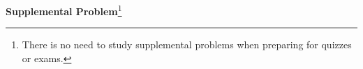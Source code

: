 \documentclass[handout]{mcs}
\begin{document}




\begin{center}
\textbf{Supplemental Problem}\footnote{There is no need to study supplemental
  problems when preparing for quizzes or exams.}
\end{center}


\iffalse
\pinput{PS_predicate_calculus_power_of_two}
\pinput{PS_6042_staff_cabal}
\pinput{FP_logic_of_leq}
\pinput{CP_logic_news_network}  %
\pinput{PS_emailed_exactly_2_others}  %
\pinput{PS_express_in_predicate_form}
\pinput{PS_express_predicates_in_formal_logic_notation}
\pinput{PS_predicate_calculus_power_of_prime}  %
\pinput{PS_predicate_calculus_power_of_two}
\pinput{PS_rewrite_assertions_prime_goldbach_bertrand_fermat}
\pinput{PS_translate_to_predicate_logic}
\pinput{CP_a_season_for_every_purpose}   %
\fi

\end{document}
